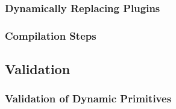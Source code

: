 \subsubsection*{Dynamically Replacing Plugins}

\subsubsection*{Compilation Steps}

\subsection{Validation}


\subsubsection*{Validation of Dynamic Primitives}

